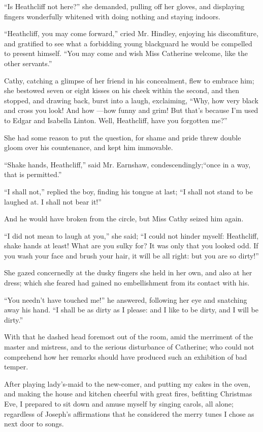 \par “Is Heathcliff not here?” she demanded, pulling off her gloves, and displaying fingers wonderfully whitened with doing nothing and staying indoors.
\par “Heathcliff, you may come forward,” cried Mr. Hindley, enjoying his discomfiture, and gratified to see what a forbidding young blackguard he would be compelled to present himself. “You may come and wish Miss Catherine welcome, like the other servants.”
\par Cathy, catching a glimpse of her friend in his concealment, flew to embrace him; she bestowed seven or eight kisses on his cheek within the second, and then stopped, and drawing back, burst into a laugh, exclaiming, “Why, how very black and cross you look! And how —how funny and grim! But that's because I'm used to Edgar and Isabella Linton. Well, Heathcliff, have you forgotten me?”
\par She had some reason to put the question, for shame and pride threw double gloom over his countenance, and kept him immovable.
\par “Shake hands, Heathcliff,” said Mr. Earnshaw, condescendingly;“once in a way, that is permitted.”
\par “I shall not,” replied the boy, finding his tongue at last; “I shall not stand to be laughed at. I shall not bear it!”
\par And he would have broken from the circle, but Miss Cathy seized him again.
\par “I did not mean to laugh at you,” she said; “I could not hinder myself: Heathcliff, shake hands at least! What are you sulky for? It was only that you looked odd. If you wash your face and brush your hair, it will be all right: but you are so dirty!”
\par She gazed concernedly at the dusky fingers she held in her own, and also at her dress; which she feared had gained no embellishment from its contact with his.
\par “You needn't have touched me!” he answered, following her eye and snatching away his hand. “I shall be as dirty as I please: and I like to be dirty, and I will be dirty.”
\par With that he dashed head foremost out of the room, amid the merriment of the master and mistress, and to the serious disturbance of Catherine; who could not comprehend how her remarks should have produced such an exhibition of bad temper.
\par After playing lady's-maid to the new-comer, and putting my cakes in the oven, and making the house and kitchen cheerful with great fires, befitting Christmas Eve, I prepared to sit down and amuse myself by singing carols, all alone; regardless of Joseph's affirmations that he considered the merry tunes I chose as next door to songs.
